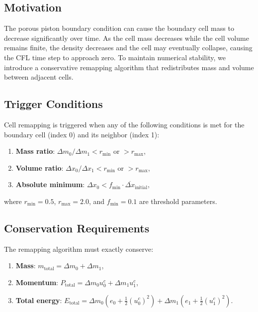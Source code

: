 \documentclass[12pt,a4paper]{article}
\newcommand{\half}{\frac{1}{2}}
\newcommand{\avg}[1]{\overline{#1}}
\begin{document}
\subsection{Motivation}

The porous piston boundary condition can cause the boundary cell mass to decrease significantly over time. As the cell mass decreases while the cell volume remains finite, the density decreases and the cell may eventually collapse, causing the CFL time step to approach zero. To maintain numerical stability, we introduce a conservative remapping algorithm that redistributes mass and volume between adjacent cells.

\subsection{Trigger Conditions}

Cell remapping is triggered when any of the following conditions is met for the boundary cell (index 0) and its neighbor (index 1):

\begin{enumerate}
    \item \textbf{Mass ratio}: $\Delta m_0 / \Delta m_1 < r_{\min}$ or $> r_{\max}$,
    \item \textbf{Volume ratio}: $\Delta x_0 / \Delta x_1 < r_{\min}$ or $> r_{\max}$,
    \item \textbf{Absolute minimum}: $\Delta x_0 < f_{\min} \cdot \avg{\Delta x}_{\text{initial}}$,
\end{enumerate}

\noindent where $r_{\min} = 0.5$, $r_{\max} = 2.0$, and $f_{\min} = 0.1$ are threshold parameters.

\subsection{Conservation Requirements}

The remapping algorithm must exactly conserve:
\begin{enumerate}
    \item \textbf{Mass}: $m_{\text{total}} = \Delta m_0 + \Delta m_1$,
    \item \textbf{Momentum}: $P_{\text{total}} = \Delta m_0 u_0^c + \Delta m_1 u_1^c$,
    \item \textbf{Total energy}: $E_{\text{total}} = \Delta m_0 (e_0 + \half (u_0^c)^2) + \Delta m_1 (e_1 + \half (u_1^c)^2)$.
\end{enumerate}
\end{document}
